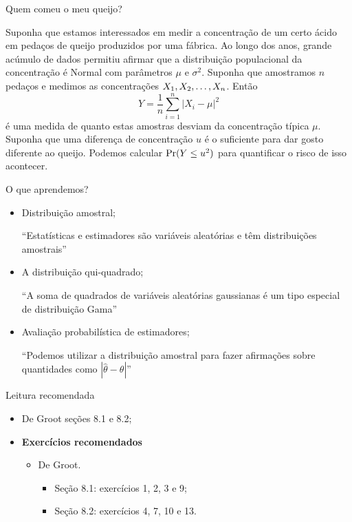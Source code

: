 \begin{frame}{Quem comeu o meu queijo?}
 \begin{exemplo}
  Suponha que estamos interessados em medir a concentração de um certo ácido em pedaços de queijo produzidos por uma fábrica.
  Ao longo dos anos, grande acúmulo de dados permitiu afirmar que a distribuição populacional da concentração é Normal com parâmetros $\mu$ e $\sigma^2$.
  Suponha que amostramos $n$ pedaços e medimos as concentrações $X_1, X_2, \ldots, X_n$.
  Então 
  \[ Y = \frac{1}{n}\sum_{i=1}^n |X_i-\mu|^2 \]
é uma medida de quanto estas amostras desviam da concentração típica $\mu$.
Suponha que uma diferença de concentração $u$ é o suficiente para dar gosto diferente ao queijo.
Podemos calcular $\operatorname{Pr}(Y \leq u^2)$ para quantificar o risco de isso acontecer.
 \end{exemplo}

\end{frame}



\begin{frame}{O que aprendemos?}
\begin{itemize}

  \item[\faLightbulbO] Distribuição amostral;    
  
   ``Estatísticas e estimadores são variáveis aleatórias e têm distribuições amostrais''
  
  \item[\faLightbulbO] A distribuição qui-quadrado;
  
  ``A soma de quadrados de variáveis aleatórias gaussianas é um tipo especial de distribuição Gama''
  
  \item[\faLightbulbO] Avaliação probabilística de estimadores;
  
  ``Podemos utilizar a distribuição amostral para fazer afirmações sobre quantidades como $|\hat{\theta}-\theta|$''
  
  \end{itemize}
 \end{frame}

\begin{frame}{Leitura recomendada}
\begin{itemize}
 \item[\faBook] De Groot seções 8.1 e 8.2;
 \item {\large\textbf{Exercícios recomendados}}
 \begin{itemize}
  \item[\faBookmark] De Groot.
  \begin{itemize}
   \item Seção 8.1: exercícios 1, 2, 3 e 9;
   \item Seção 8.2: exercícios 4, 7, 10 e 13.
  \end{itemize}   
  \end{itemize}
 \end{itemize} 
\end{frame}
